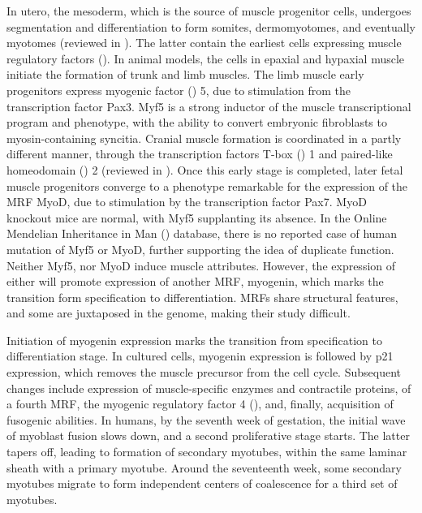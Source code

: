\documentclass[12pt,english]{report}\usepackage[]{graphicx}\usepackage[]{color}
\begin{document}
In utero, the mesoderm, which is the source of muscle progenitor cells,
undergoes segmentation and differentiation to form somites, dermomyotomes,
and eventually myotomes (reviewed in \citep{yusuf2012myogenesis}).
The latter contain the earliest cells expressing muscle regulatory
factors (). In animal
models, the cells in epaxial and hypaxial muscle initiate the formation
of trunk and limb muscles. The limb muscle early progenitors express
myogenic factor () 5, due to stimulation
from the transcription factor Pax3\citep{daston1996pax-3,francetic2011skeletal}.
Myf5 is a strong inductor of the muscle transcriptional program and
phenotype, with the ability to convert embryonic fibroblasts to myosin-containing
syncitia\citep{braun1989novel}. Cranial muscle formation is coordinated
in a partly different manner, through the transcription factors T-box
() 1 and paired-like homeodomain ()
2 (reviewed in \citep{noden2005relations}). Once this early stage
is completed, later fetal muscle progenitors converge to a phenotype
remarkable for the expression of the MRF MyoD, due to stimulation
by the transcription factor Pax7\citep{tajbakhsh1997redefining}.
MyoD knockout mice are normal, with Myf5 supplanting its absence\citep{rudnicki1993myod}.
In the Online Mendelian Inheritance in Man ()
database, there is no reported case of human mutation of Myf5 or MyoD,
further supporting the idea of duplicate function. Neither Myf5, nor
MyoD induce muscle attributes. However, the expression of either will
promote expression of another MRF, myogenin, which marks the transition
form specification to differentiation. MRFs share structural features,
and some are juxtaposed in the genome, making their study difficult.

Initiation of myogenin expression marks the transition from specification
to differentiation stage. In cultured cells, myogenin expression is
followed by p21 expression, which removes the muscle precursor from
the cell cycle\citep{andres1996myogenin}. Subsequent changes include
expression of muscle-specific enzymes and contractile proteins\citep{bergstrom2001molecular},
of a fourth MRF, the myogenic regulatory factor 4 ()\citep{hasty1993muscle},
and, finally, acquisition of fusogenic abilities. In humans, by the
seventh week of gestation, the initial wave of myoblast fusion slows
down, and a second proliferative stage starts. The latter tapers off,
leading to formation of secondary myotubes, within the same laminar
sheath with a primary myotube. Around the seventeenth week, some secondary
myotubes migrate to form independent centers of coalescence for a
third set of myotubes\citep{draeger1987primary}.
\end{document}
